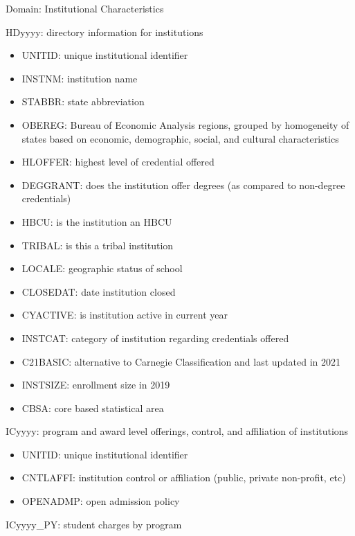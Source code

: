 \documentclass[sigconf, authorversion, nonacm]{acmart}
\begin{document}
    Domain: Institutional Characteristics

    HDyyyy: directory information for institutions

    \begin{itemize}
        \item UNITID: unique institutional identifier
        \item INSTNM: institution name
        \item STABBR: state abbreviation
        \item OBEREG: Bureau of Economic Analysis regions, grouped by homogeneity of states based on economic, demographic, social, and cultural characteristics
        \item HLOFFER: highest level of credential offered
        \item DEGGRANT: does the institution offer degrees (as compared to non-degree credentials)
        \item HBCU: is the institution an HBCU
        \item TRIBAL: is this a tribal institution
        \item LOCALE: geographic status of school
        \item CLOSEDAT: date institution closed
        \item CYACTIVE: is institution active in current year
        \item INSTCAT: category of institution regarding credentials offered
        \item C21BASIC: alternative to Carnegie Classification and last updated in 2021
        \item INSTSIZE: enrollment size in 2019
        \item CBSA: core based statistical area
    \end{itemize}

    ICyyyy: program and award level offerings, control, and affiliation of institutions

    \begin{itemize}
        \item UNITID: unique institutional identifier
        \item CNTLAFFI: institution control or affiliation (public, private non-profit, etc)
        \item OPENADMP: open admission policy
    \end{itemize}

    ICyyyy_PY: student charges by program
\end{document}
